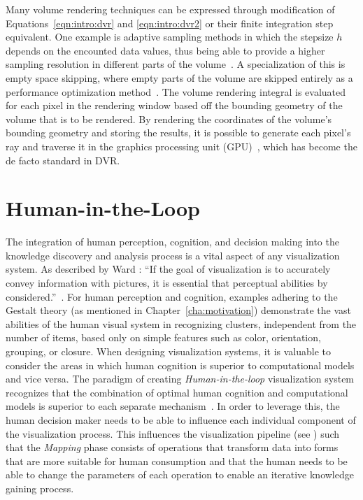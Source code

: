 Many volume rendering techniques can be expressed through modification of Equations~\ref{eqn:intro:dvr} and \ref{eqn:intro:dvr2} or their finite integration step equivalent.  One example is adaptive sampling methods in which the stepsize $h$ depends on the encounted data values, thus being able to provide a higher sampling resolution in different parts of the volume~\cite{danskin1992fast}.  A specialization of this is empty space skipping, where empty parts of the volume are skipped entirely as a performance optimization method~\cite{yagel1993accelerating}.  The volume rendering integral is evaluated for each pixel in the rendering window based off the bounding geometry of the volume that is to be rendered.  By rendering the coordinates of the volume's bounding geometry and storing the results, it is possible to generate each pixel's ray and traverse it in the graphics processing unit (GPU)~\cite{kruger2003acceleration}, which has become the de facto standard in DVR.



\section{Human-in-the-Loop} \label{cha:intro:hitl}
The integration of human perception, cognition, and decision making into the knowledge discovery and analysis process is a vital aspect of any visualization system.  As described by Ward \etal : ``If the goal of visualization is to accurately convey information with pictures, it is essential that perceptual abilities by considered.''~\cite{ward2010interactive}.  For human perception and cognition, examples adhering to the Gestalt theory (as mentioned in Chapter~\ref{cha:motivation}) demonstrate the vast abilities of the human visual system in recognizing clusters, independent from the number of items, based only on simple features such as color, orientation, grouping, or closure.  When designing visualization systems, it is valuable to consider the areas in which human cognition is superior to computational models and vice versa.  The paradigm of creating \emph{Human-in-the-loop} visualization system recognizes that the combination of optimal human cognition and computational models is superior to each separate mechanism~\cite{munzner2014visualization}.  In order to leverage this, the human decision maker needs to be able to influence each individual component of the visualization process.  This influences the visualization pipeline (see ) such that the \emph{Mapping} phase consists of operations that transform data into forms that are more suitable for human consumption and that the human needs to be able to change the parameters of each operation to enable an iterative knowledge gaining process.

